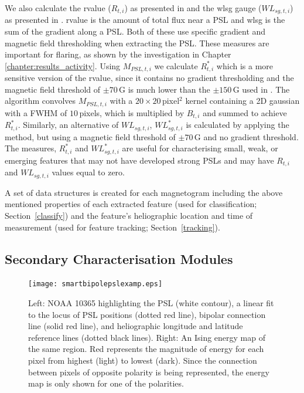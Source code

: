 We also calculate the \gls{rvalue} ($R_{t,i}$) as presented in \citet{Schrijver:2007} and the \gls{wlsg} gauge ($WL_{sg,t,i}$) as presented in \citet{Falconer:2008}. \gls{rvalue} is the amount of total flux near a \gls{PSL} and \gls{wlsg} is the sum of the gradient along a \gls{PSL}. Both of these use specific gradient and magnetic field thresholding when extracting the \gls{PSL}. These measures are important for flaring, as shown by the investigation in Chapter\,\ref{chapter:results_activity}. Using $M_{PSL,t,i}$ we calculate $R^{*}_{t,i}$ which is a more sensitive version of the \gls{rvalue}, since it contains no gradient thresholding and the magnetic field threshold of $\pm$$70$\,G is much lower than the $\pm$$150$\,G used in \citet{Schrijver:2007}. The algorithm convolves $M_{PSL,t,i}$ with a $20\times20$\,pixel$^2$ kernel containing a 2D gaussian with a FWHM of $10$\,pixels, which is multiplied by $B_{t,i}$ and summed to achieve $R_{t,i}^{*}$. Similarly, an alternative of $WL_{sg,t,i}$, $WL^{*}_{sg,t,i}$ is calculated by applying the \citet{Falconer:2008} method, but using a magnetic field threshold of $\pm$$70$\,G and no gradient threshold. The measures, $R^{*}_{t,i}$ and $WL^{*}_{sg,t,i}$ are useful for characterising small, weak, or emerging features that may not have developed strong PSLs and may have $R_{t,i}$ and $WL_{sg,t,i}$ values equal to zero.

A set of data structures is created for each magnetogram including the above mentioned properties of each extracted feature (used for classification; Section~\ref{classify}) and the feature's heliographic location and time of measurement (used for feature tracking; Section~\ref{tracking}).


\subsection{Secondary Characterisation Modules} \label{sect:char2}

\begin{figure}[!t]
\centerline{\texttt{[image: smartbipolepslexamp.eps]}}
\caption[Example PSL and Ising energy determination.]{Left: NOAA 10365 highlighting the PSL (white contour), a linear fit to the locus of PSL positions (dotted red line), bipolar
connection line (solid red line),
and heliographic longitude and latitude reference lines (dotted black lines). Right: An
Ising energy map of
the same region. Red represents the magnitude of energy for each pixel from
highest (light) to lowest (dark). Since the connection between pixels of
opposite polarity is being represented, the energy map is only shown for one of
the polarities.}
\label{smartbipolepslexamp}
\end{figure}

